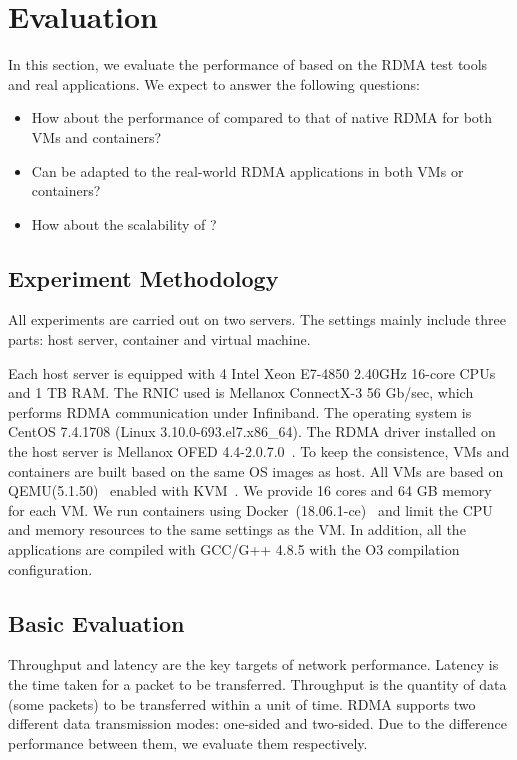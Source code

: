 \section{Evaluation} \label{eval}
In this section, we evaluate the performance of \sys based on the RDMA test tools and real applications. We expect to answer the following questions:

\begin{itemize}
\item How about the performance of \sys compared to that of native RDMA for both VMs and containers?
\item Can \sys be adapted to the real-world RDMA applications in both VMs or containers?
\item How about the scalability of \sys?
\end{itemize}

\subsection{Experiment Methodology}


All experiments are carried out on two servers. The settings mainly include three parts: host server, container and virtual machine. 

Each host server is equipped with 4 Intel Xeon E7-4850 2.40GHz 16-core CPUs and 1 TB RAM. The RNIC used is Mellanox ConnectX-3 56 Gb/sec, which performs RDMA communication under Infiniband.  The operating system is CentOS 7.4.1708 (Linux 3.10.0-693.el7.x86\_64). The RDMA driver installed on the host server is Mellanox OFED 4.4-2.0.7.0~\cite{mlnx-ofed}. To keep the consistence, VMs and containers are built based on the same OS images as host. All VMs are based on QEMU(5.1.50)~\cite{qemu} enabled with KVM~\cite{kvm}. We provide 16 cores and 64 GB memory for each VM. We run containers using Docker~(18.06.1-ce)~\cite{docker} and limit the CPU and memory resources to the same settings as the VM. In addition, all the applications are compiled with GCC/G++ 4.8.5 with the O3 compilation configuration. 


\subsection{Basic Evaluation}

Throughput and latency are the key targets of network performance. Latency is the time taken for a packet to be transferred. Throughput is the quantity of data (some packets) to be transferred within a unit of time. RDMA supports two different data transmission modes: one-sided and two-sided. Due to the difference performance between them, we evaluate them respectively.

